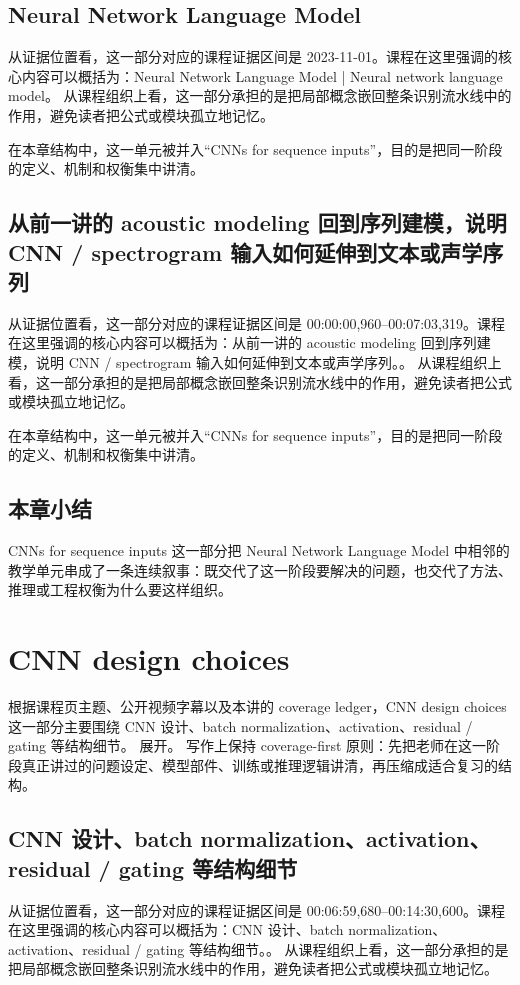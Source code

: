 \documentclass[a4paper]{article}
\begin{document}
\subsection{Neural Network Language Model}
从证据位置看，这一部分对应的课程证据区间是 2023-11-01。课程在这里强调的核心内容可以概括为：Neural Network Language Model | Neural network language model。
从课程组织上看，这一部分承担的是把局部概念嵌回整条识别流水线中的作用，避免读者把公式或模块孤立地记忆。

在本章结构中，这一单元被并入“CNNs for sequence inputs”，目的是把同一阶段的定义、机制和权衡集中讲清。

\subsection{从前一讲的 acoustic modeling 回到序列建模，说明 CNN / spectrogram 输入如何延伸到文本或声学序列}
从证据位置看，这一部分对应的课程证据区间是 00:00:00,960--00:07:03,319。课程在这里强调的核心内容可以概括为：从前一讲的 acoustic modeling 回到序列建模，说明 CNN / spectrogram 输入如何延伸到文本或声学序列。。
从课程组织上看，这一部分承担的是把局部概念嵌回整条识别流水线中的作用，避免读者把公式或模块孤立地记忆。

在本章结构中，这一单元被并入“CNNs for sequence inputs”，目的是把同一阶段的定义、机制和权衡集中讲清。

\subsection{本章小结}
CNNs for sequence inputs 这一部分把 Neural Network Language Model 中相邻的教学单元串成了一条连续叙事：既交代了这一阶段要解决的问题，也交代了方法、推理或工程权衡为什么要这样组织。

\section{CNN design choices}
根据课程页主题、公开视频字幕以及本讲的 coverage ledger，CNN design choices 这一部分主要围绕 CNN 设计、batch normalization、activation、residual / gating 等结构细节。 展开。
写作上保持 coverage-first 原则：先把老师在这一阶段真正讲过的问题设定、模型部件、训练或推理逻辑讲清，再压缩成适合复习的结构。

\subsection{CNN 设计、batch normalization、activation、residual / gating 等结构细节}
从证据位置看，这一部分对应的课程证据区间是 00:06:59,680--00:14:30,600。课程在这里强调的核心内容可以概括为：CNN 设计、batch normalization、activation、residual / gating 等结构细节。。
从课程组织上看，这一部分承担的是把局部概念嵌回整条识别流水线中的作用，避免读者把公式或模块孤立地记忆。
\end{document}
